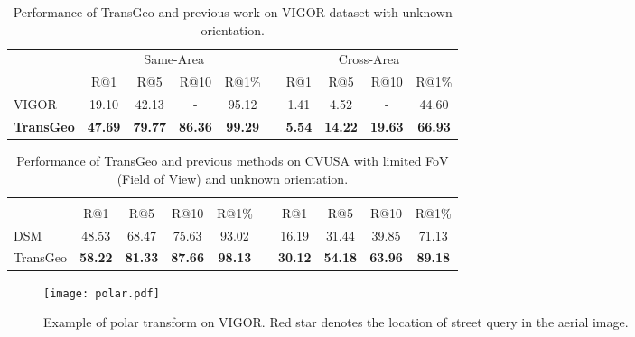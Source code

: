 \documentclass[10pt,twocolumn,letterpaper]{article}
\begin{document}
\begin{table*}[!htbp]
\centering
    \begin{tabular}{l c c c c c c c c c}
    \hline
    
    \hline & \multicolumn{4}{c}{Same-Area}& & \multicolumn{4}{c}{Cross-Area} \\
    \cline{2-5} \cline{7-10}
      ~ & R@1 & R@5 & R@10 & R@1\%  &  & R@1 & R@5 & R@10 & R@1\%  \\
     \hline
     \hline
     VIGOR \cite{zhu2021vigor} & 19.10 & 42.13 & - & 95.12 &  & 1.41 & 4.52 & - & 44.60  \\
\textbf{TransGeo}  & \textbf{47.69}  & \textbf{79.77}& \textbf{86.36} & \textbf{99.29} & & \textbf{5.54} & \textbf{14.22} & \textbf{19.63}  & \textbf{66.93} \\
    \hline
    
    \hline
    \end{tabular}
    \caption{Performance of TransGeo and previous work \cite{zhu2021vigor} on VIGOR dataset with unknown orientation.}
    \label{tab:vigor_orientation}
\end{table*}


\begin{table*}[!htbp]
\centering
    \begin{tabular}{l c c c c c c c c c}
    \hline
    
    \hline \multirow{2}{*}{}  & \multicolumn{4}{c}{\textbf{}}& & \multicolumn{4}{c}{\textbf{}} \\
    \cline{2-5} \cline{7-10} 
      ~ & R@1 & R@5 & R@10 & R@1\%   &  & R@1 & R@5 & R@10 & R@1\% \\
     \hline
     \hline
     DSM \cite{shi2020looking} & 48.53 & 68.47 & 75.63 & 93.02 &  & 16.19 & 31.44  & 39.85 & 71.13 \\
TransGeo & \textbf{58.22} & \textbf{81.33} & \textbf{87.66} & \textbf{98.13} & & \textbf{30.12} & \textbf{54.18}  & \textbf{63.96} & \textbf{89.18} \\
    \hline
    
    \hline
    \end{tabular}
    \caption{Performance of TransGeo and previous methods on CVUSA with limited FoV (Field of View) and unknown orientation.}
    \label{tab:fov}
\end{table*}
\begin{figure*}[!htbp]
    \centering
    \texttt{[image: polar.pdf]}
    \caption{Example of polar transform on VIGOR. Red star denotes the location of street query in the aerial image.}
    \label{fig:polar_vigor}
\end{figure*}
\end{document}
